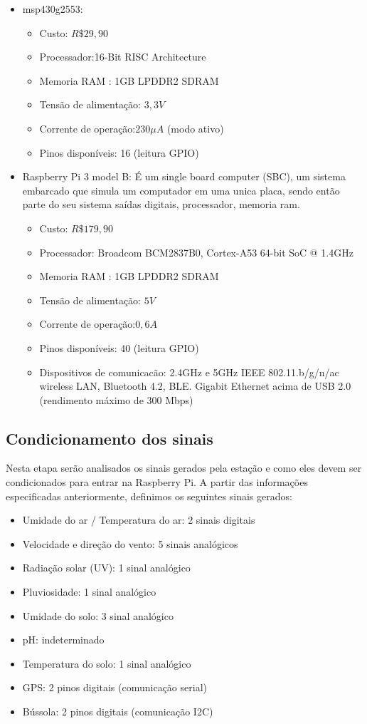 		
\begin{itemize}
\item msp430g2553:
    \begin{itemize}
		\item Custo: $R\$ 29,90$
		\item Processador:16-Bit RISC Architecture
		\item Memoria RAM : 1GB LPDDR2 SDRAM
		\item Tensão de alimentação: $3,3V$
		\item Corrente de operação:$230 \mu A$ (modo ativo)	
		\item Pinos disponíveis: 16 (leitura GPIO)
	\end{itemize}
\item Raspberry Pi 3 model B: É um single board computer (SBC), um sistema embarcado que simula um computador em uma unica placa, sendo então parte do seu sistema saídas digitais, processador, memoria ram. 
	\begin{itemize}
		\item Custo: $R\$ 179,90$
		\item Processador: Broadcom BCM2837B0, Cortex-A53 64-bit SoC @ 1.4GHz
		\item Memoria RAM : 1GB LPDDR2 SDRAM
		\item Tensão de alimentação: $5V$
		\item Corrente de operação:$0,6 A$	
		\item Pinos disponíveis: 40 (leitura GPIO)
		\item Dispositivos de comunicacão: 2.4GHz e 5GHz IEEE 802.11.b/g/n/ac wireless LAN, Bluetooth 4.2, BLE. Gigabit Ethernet acima de USB 2.0 (rendimento máximo de 300 Mbps)
    \end{itemize}
\end{itemize}				  		
	\subsection{Condicionamento dos sinais}
	
	Nesta etapa serão analisados os sinais gerados pela estação e como eles devem ser condicionados para entrar na Raspberry Pi. A partir das informações especificadas anteriormente, definimos os seguintes sinais gerados:
	
	\begin{itemize}
			\item Umidade do ar / Temperatura do ar: 2 sinais digitais
			\item Velocidade e direção do vento: 5 sinais analógicos
			\item Radiação solar (UV): 1 sinal analógico
			\item Pluviosidade: 1 sinal analógico
			\item Umidade do solo: 3 sinal analógico
			\item pH: indeterminado
			\item Temperatura do solo: 1 sinal analógico
			\item GPS: 2 pinos digitais (comunicação serial)
			\item Bússola: 2 pinos digitais (comunicação I2C)
	\end{itemize}
	
